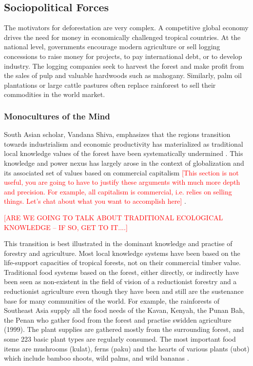 \subsection{Sociopolitical Forces}

The motivators for deforestation are very complex. A competitive global economy drives the need for money in economically challenged tropical countries. At the national level, governments encourage modern agriculture or sell logging concessions to raise money for projects, to pay international debt, or to develop industry. The logging companies seek to harvest the forest and make profit from the sales of pulp and valuable hardwoods such as mahogany. Similarly, palm oil plantations or large cattle pastures often replace rainforest to sell their commodities in the world market. 

\subsubsection{Monocultures of the Mind}
South Asian scholar, Vandana Shiva, emphasizes that the regions transition towards industrialism and economic productivity has materialized as traditional local knowledge values of the forest have been systematically undermined \citep{shiva1993monocultures}. This knowledge and power nexus has largely arose in the context of globalization and its associated set of values based on commercial capitalism \textcolor{red}{[This section is not useful, you are going to have to justify these arguments with much more depth and precision. For example, all capitalism is commercial, i.e. relies on selling things. Let's chat about what you want to accomplish here]} \citealp{king1993politik}.

\textcolor{red}{[ARE WE GOING TO TALK ABOUT TRADITIONAL ECOLOGICAL KNOWLEDGE -- IF SO, GET TO IT....]}

This transition is best illustrated in the dominant knowledge and practise of forestry and agriculture. Most local knowledge systems have been based on the life-support capacities of tropical forests, not on their commercial timber value. Traditional food systems based on the forest, either directly, or indirectly have been seen as non-existent in the field of vision of a reductionist forestry and a reductionist agriculture even though they have been and still are the sustenance base for many communities of the world. For example, the rainforests of Southeast Asia supply all the food needs of the Kavan, Kenyah, the Punan Bah, the Penan who gather food from the forest and practise swidden agriculture (1999). The plant supplies are gathered mostly from the surrounding forest, and some 223 basic plant types are regularly consumed. The most important food items are mushrooms (kulat), ferns (paku) and the hearts of various plants (ubot) which include bamboo shoots, wild palms, and wild bananas \citep{hong1987natives}.

